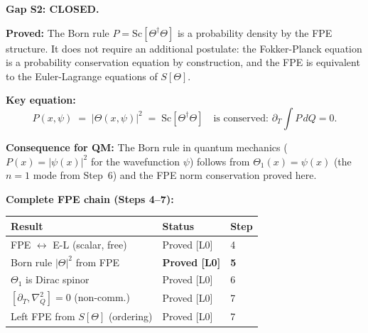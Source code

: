 \documentclass[12pt,a4paper]{article}
\theoremstyle{definition}
\theoremstyle{remark}
\begin{document}
\begin{resultbox}
\textbf{Gap S2: CLOSED.}

\textbf{Proved:} The Born rule $P = \mathrm{Sc}[\Theta^\dagger\Theta]$
is a probability density by the FPE structure.  It does not require
an additional postulate: the Fokker-Planck equation is a probability
conservation equation by construction, and the FPE is equivalent to
the Euler-Lagrange equations of $S[\Theta]$.

\textbf{Key equation:}
\begin{equation}
  P(x,\psi) \;=\; |\Theta(x,\psi)|^2
             \;=\; \mathrm{Sc}[\Theta^\dagger\Theta]
  \quad\text{is conserved: } \partial_T\int P\,dQ = 0.
\end{equation}

\textbf{Consequence for QM:} The Born rule in quantum mechanics
($P(x) = |\psi(x)|^2$ for the wavefunction $\psi$) follows from
$\Theta_1(x) = \psi(x)$ (the $n=1$ mode from Step~6) and the FPE
norm conservation proved here.

\textbf{Complete FPE chain (Steps 4--7):}
\begin{center}
\begin{tabular}{lll}
  \toprule
  Result & Status & Step \\
  \midrule
  FPE $\leftrightarrow$ E-L (scalar, free) & Proved [L0] & 4 \\
  Born rule $|\Theta|^2$ from FPE & \textbf{Proved [L0]} & \textbf{5} \\
  $\Theta_1$ is Dirac spinor & Proved [L0] & 6 \\
  $[\partial_T, \nabla_Q^2] = 0$ (non-comm.) & Proved [L0] & 7 \\
  Left FPE from $S[\Theta]$ (ordering) & Proved [L0] & 7 \\
  \bottomrule
\end{tabular}
\end{center}
\end{resultbox}

\ifdefined\INCLUDEMODE
\else
  
\end{document}
